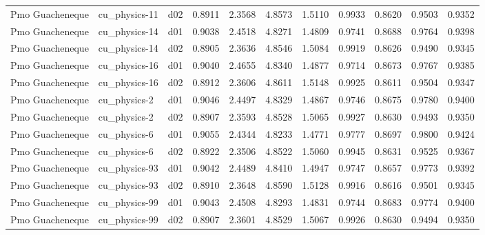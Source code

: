 \begin{longtable}{lllrrrrrrrr}
      Pmo Guacheneque  &         cu\_physics-11 &     d02 &   0.8911 &   2.3568 &   4.8573 &       1.5110 &        0.9933 &       0.8620 &           0.9503 &  0.9352 \\
      Pmo Guacheneque  &         cu\_physics-14 &     d01 &   0.9038 &   2.4518 &   4.8271 &       1.4809 &        0.9741 &       0.8688 &           0.9764 &  0.9398 \\
      Pmo Guacheneque  &         cu\_physics-14 &     d02 &   0.8905 &   2.3636 &   4.8546 &       1.5084 &        0.9919 &       0.8626 &           0.9490 &  0.9345 \\
      Pmo Guacheneque  &         cu\_physics-16 &     d01 &   0.9040 &   2.4655 &   4.8340 &       1.4877 &        0.9714 &       0.8673 &           0.9767 &  0.9385 \\
      Pmo Guacheneque  &         cu\_physics-16 &     d02 &   0.8912 &   2.3606 &   4.8611 &       1.5148 &        0.9925 &       0.8611 &           0.9504 &  0.9347 \\
      Pmo Guacheneque  &          cu\_physics-2 &     d01 &   0.9046 &   2.4497 &   4.8329 &       1.4867 &        0.9746 &       0.8675 &           0.9780 &  0.9400 \\
      Pmo Guacheneque  &          cu\_physics-2 &     d02 &   0.8907 &   2.3593 &   4.8528 &       1.5065 &        0.9927 &       0.8630 &           0.9493 &  0.9350 \\
      Pmo Guacheneque  &          cu\_physics-6 &     d01 &   0.9055 &   2.4344 &   4.8233 &       1.4771 &        0.9777 &       0.8697 &           0.9800 &  0.9424 \\
      Pmo Guacheneque  &          cu\_physics-6 &     d02 &   0.8922 &   2.3506 &   4.8522 &       1.5060 &        0.9945 &       0.8631 &           0.9525 &  0.9367 \\
      Pmo Guacheneque  &         cu\_physics-93 &     d01 &   0.9042 &   2.4489 &   4.8410 &       1.4947 &        0.9747 &       0.8657 &           0.9773 &  0.9392 \\
      Pmo Guacheneque  &         cu\_physics-93 &     d02 &   0.8910 &   2.3648 &   4.8590 &       1.5128 &        0.9916 &       0.8616 &           0.9501 &  0.9345 \\
      Pmo Guacheneque  &         cu\_physics-99 &     d01 &   0.9043 &   2.4508 &   4.8293 &       1.4831 &        0.9744 &       0.8683 &           0.9774 &  0.9400 \\
      Pmo Guacheneque  &         cu\_physics-99 &     d02 &   0.8907 &   2.3601 &   4.8529 &       1.5067 &        0.9926 &       0.8630 &           0.9494 &  0.9350 \\

\end{longtable}
